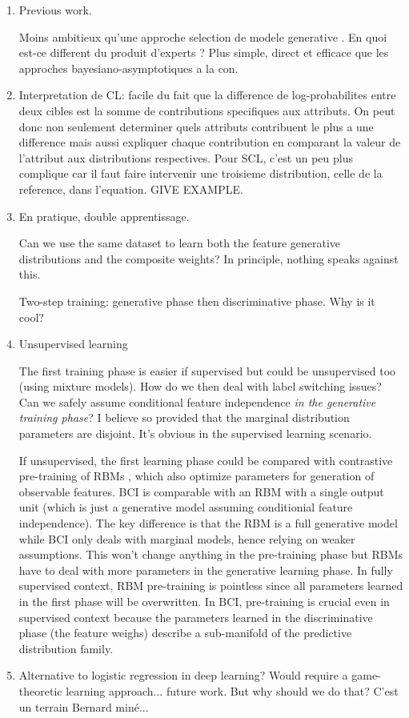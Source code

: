 \documentclass[english]{scrartcl}
\begin{document}
\begin{enumerate}
\item Previous work. 

Moins ambitieux qu'une approche selection de modele generative \cite{Wang-14,Baggenstoss-03,Yuan-99b}. En quoi est-ce different du produit d'experts \cite{Hinton-02}? Plus simple, direct et efficace que les approches bayesiano-asymptotiques a la con.

\item Interpretation de CL: facile du fait que la difference de log-probabilites entre deux cibles est la somme de contributions specifiques aux attributs. On peut donc non seulement determiner quels attributs contribuent le plus a une difference mais aussi expliquer chaque contribution en comparant la valeur de l'attribut aux distributions respectives. Pour SCL, c'est un peu plus complique car il faut faire intervenir une troisieme distribution, celle de la reference, dans l'equation. GIVE EXAMPLE.

\item En pratique, double apprentissage. 

{\color{red} Can we use the same dataset to learn both the feature generative distributions and the composite weights? In principle, nothing speaks against this.} 

{\color{red}Two-step training: generative phase then discriminative phase. Why is it cool?}

\item Unsupervised learning

The first training phase is easier if supervised but could be unsupervised too (using mixture models). How do we then deal with label switching issues? Can we safely assume conditional feature independence {\em in the generative training phase}? I believe so provided that the marginal distribution parameters are disjoint. It's obvious in the supervised learning scenario.

If unsupervised, the first learning phase could be compared with contrastive pre-training of RBMs \cite{Hinton-06,Fischer-14}, which also optimize parameters for generation of observable features. BCI is comparable with an RBM with a single output unit (which is just a generative model assuming conditionial feature independence). The key difference is that the RBM is a full generative model while BCI only deals with marginal models, hence relying on weaker assumptions. This won't change anything in the pre-training phase but RBMs have to deal with more parameters in the generative learning phase. In fully supervised context, RBM pre-training is pointless since all parameters learned in the first phase will be overwritten. In BCI, pre-training is crucial even in supervised context because the parameters learned in the discriminative phase (the feature weighs) describe a sub-manifold of the predictive distribution family.

\item {\color{red} Alternative to logistic regression in deep learning? Would require a game-theoretic learning approach... future work.} But why should we do that? C'est un terrain Bernard min\'e...

\end{enumerate}
\end{document}
